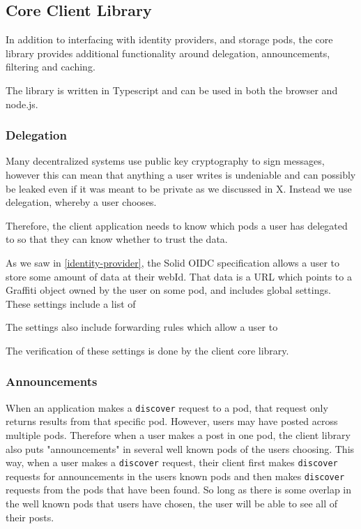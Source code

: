 \subsection{Core Client Library}

In addition to interfacing with identity providers,
and storage pods, the core library provides additional functionality
around delegation, announcements, filtering and caching.

The library is written in Typescript and can be used in both the browser and node.js.

\subsubsection{Delegation}

Many decentralized systems use public key cryptography to sign messages,
however this can mean that anything a user writes is undeniable and can
possibly be leaked even if it was meant to be private as we discussed in X.
Instead we use delegation, whereby a user chooses.

Therefore, the client application needs to know which pods a user has delegated
to so that they can know whether to trust the data.

As we saw in \cref{identity-provider}, the Solid OIDC specification
allows a user to store some amount of data at their webId.
That data is a URL which points to a Graffiti object owned by the user
on some pod, and includes global settings.
These settings include a list of

The settings also include forwarding rules which allow a user to

The verification of these settings is done by the client core library.

\subsubsection{Announcements}

When an application makes a \texttt{discover} request to a pod, that request
only returns results from that specific pod. However, users may have posted across
multiple pods. Therefore when a user makes a post in one pod, the client library
also puts "announcements" in several well known pods of the users choosing.
This way, when a user makes a \texttt{discover} request, their client first
makes \texttt{discover} requests for announcements in the users known pods
and then makes \texttt{discover} requests from the pods that have been found.
So long as there is some overlap in the well known pods that users have chosen,
the user will be able to see all of their posts.

